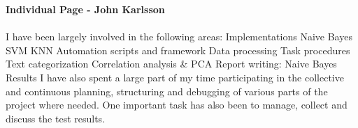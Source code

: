 \newpage
\textbf{Individual Page - John Karlsson} \\\\
I have been largely involved in the following areas:
Implementations
	Naive Bayes
	SVM
	KNN
	Automation scripts and framework
		Data processing
		Task procedures
			Text categorization
			Correlation analysis \& PCA
Report writing:
	Naive Bayes
	Results
I have also spent a large part of my time participating in the collective and continuous planning, structuring and debugging of various parts of the project where needed. One important task has also been to manage, collect and discuss the test results.
